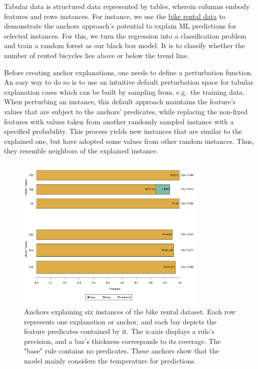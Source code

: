 \documentclass[
  10pt,
]{scrbook}
\begin{document}
Tabular data is structured data represented by tables, wherein columns embody features and rows instances.
For instance, we use the \protect\hyperlink{bike-data}{bike rental data} to demonstrate the anchors approach's potential to explain ML predictions for selected instances. For this, we turn the regression into a classification problem and train a random forest as our black box model. It is to classify whether the number of rented bicycles lies above or below the trend line.

Before creating anchor explanations, one needs to define a perturbation function.
An easy way to do so is to use an intuitive default perturbation space for tabular explanation cases which can be built by sampling from, e.g.~the training data.
When perturbing an instance, this default approach maintains the feature's values that are subject to the anchors' predicates, while replacing the non-fixed features with values taken from another randomly sampled instance with a specified probability.
This process yields new instances that are similar to the explained one, but have adopted some values from other random instances.
Thus, they resemble neighbors of the explained instance.

\begin{figure}

{\centering \includegraphics[width=0.8\textwidth]{images/unnamed-chunk-33-1} 

}

\caption{Anchors explaining six instances of the bike rental dataset. Each row represents one explanation or anchor, and each bar depicts the feature predicates contained by it. The x-axis displays a rule's precision, and a bar's thickness corresponds to its coverage. The "base" rule contains no predicates. These anchors show that the model mainly considers the temperature for predictions.}\label{fig:unnamed-chunk-33}
\end{figure}
\end{document}
